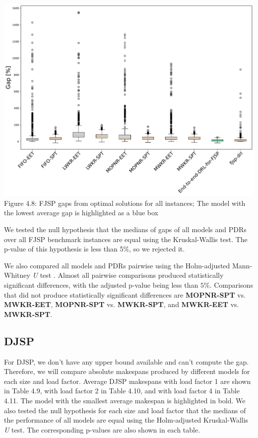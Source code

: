 \begin{center}
    \includegraphics[width=0.8\linewidth]{images/horizontal_boxplot_fjsp_all.pdf}\\
    Figure 4.8: FJSP gaps from optimal solutions for all instances; The model with the lowest average gap is highlighted as a blue box
\end{center}

We tested the null hypothesis that the medians of gaps of all models and PDRs over all FJSP benchmark instances are equal using the Kruskal-Wallis test. The p-value of this hypothesis is less than 5$\%$, so we rejected it. 
\par
We also compared all models and PDRs pairwise using the Holm-adjusted Mann-Whitney \textit{U} test \cite{mannwhitneyutest}. Almost all pairwise comparisons produced statistically significant differences, with the adjusted p-value being less than $5\%$. Comparisons that did not produce statistically significant differences are \textbf{MOPNR-SPT} vs. \textbf{MWKR-EET}, \textbf{MOPNR-SPT} vs. \textbf{MWKR-SPT}, and \textbf{MWKR-EET} vs. \textbf{MWKR-SPT}.

\subsection{DJSP}

For DJSP, we don't have any upper bound available and can't compute the gap. Therefore, we will compare absolute makespans produced by different models for each size and load factor. Average DJSP makespans with load factor 1 are shown in Table 4.9, with load factor 2 in Table 4.10, and with load factor 4 in Table 4.11. The model with the smallest average makespan is highlighted in bold. We also tested the null hypothesis for each size and load factor that the medians of the performance of all models are equal using the Holm-adjusted Kruskal-Wallis \textit{U} test. The corresponding p-values are also shown in each table.

